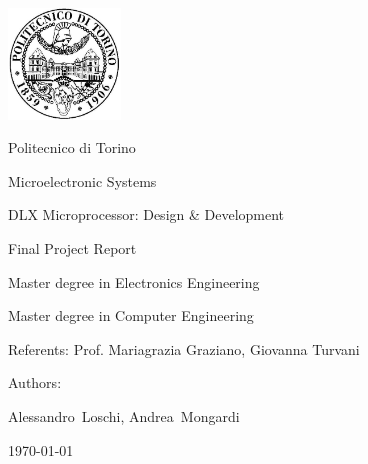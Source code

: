 \documentclass[10pt,  english, makeidx, a4paper, titlepage, oneside]{book}
\begin{document}
\frontmatter
\begin{titlepage}
\vspace{0cm}
\centerline{
\includegraphics[width=3cm]{./logopoli}} 
\vspace{0.5cm}
\centerline{\LARGE Politecnico di Torino}
\vspace{2.5cm}
\centerline{\huge\sf Microelectronic Systems}
\vspace{1cm}
\centerline{\Huge\sf DLX Microprocessor: Design \& Development}
\bigskip
\centerline{\huge\sf Final Project Report}
\vspace{2cm}
\centerline{\Large Master degree in Electronics Engineering}
\bigskip
\centerline{\Large Master degree in Computer Engineering}
\vspace{4.5cm}%
%
\centerline{\large Referents: Prof. Mariagrazia Graziano, Giovanna Turvani}
\bigskip
\vspace{1cm}
%
%
\centerline{\large Authors:}
\bigskip
%
%
\centerline{\large Alessandro\ Loschi, Andrea\ Mongardi}
%
\vspace{2cm}
\centerline{\large \today}
\end{titlepage}

\tableofcontents

\mainmatter
%    
%




% 
%
%    
%
\appendix

% 
%
\end{document}
